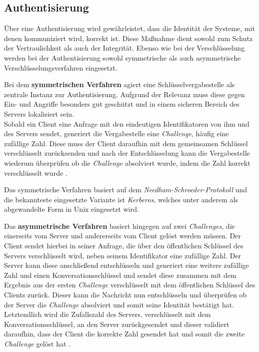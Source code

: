 \documentclass[12pt,a4paper,parskip=half]{scrreprt}
\begin{document}
			\subsection{Authentisierung}
				
				Über eine Authentisierung wird gewährleistet, dass die Identität der Systeme, mit denen kommuniziert wird, korrekt ist. Diese Maßnahme dient sowohl zum Schutz der Vertraulichkeit als auch der Integrität. Ebenso wie bei der Verschlüsselung werden bei der Authentisierung sowohl symmetrische als auch asymmetrische Verschlüsselungsverfahren eingesetzt.
				
				Bei dem \textbf{symmetrischen Verfahren} agiert eine Schlüsselvergabestelle als zentrale Instanz zur Authentisierung. Aufgrund der Relevanz muss diese gegen Ein- und Angriffe besonders gut geschützt und in einem sicheren Bereich des Servers lokalisiert sein. \\
				Sobald ein Client eine Anfrage mit den eindeutigen Identifikatoren von ihm und des Servers sendet, generiert die Vergabestelle eine \textit{Challenge}, häufig eine zufällige Zahl. Diese muss der Client daraufhin mit dem gemeinsamen Schlüssel verschlüsselt zurücksenden und nach der Entschlüsselung kann die Vergabestelle wiederum überprüfen ob die \textit{Challenge} absolviert wurde, indem die Zahl korrekt verschlüsselt wurde \cite{verteilteSysteme}.
				
				Das symmetrische Verfahren basiert auf dem \textit{Needham-Schroeder-Protokoll} und die bekannteste eingesetzte Variante ist \textit{Kerberos}, welches unter anderem als abgewandelte Form in Unix eingesetzt wird.
				
				Das \textbf{asymmetrische Verfahren} basiert hingegen auf zwei \textit{Challenges}, die einerseits vom Server und andererseits vom Client gelöst werden müssen. Der Client sendet hierbei in seiner Anfrage, die über den öffentlichen Schlüssel des Servers verschlüsselt wird, neben seinem Identifikator eine zufällige Zahl. Der Server kann diese anschließend entschlüsseln und generiert eine weitere zufällige Zahl und einen Konversationsschlüssel und sendet diese zusammen mit dem Ergebnis aus der ersten \textit{Challenge} verschlüsselt mit dem öffentlichen Schlüssel des Clients zurück. Dieser kann die Nachricht nun entschlüsseln und überprüfen ob der Server die \textit{Challenge} absolviert und somit seine Identität bestätigt hat. Letztendlich wird die Zufallszahl des Servers, verschlüsselt mit dem Konversationsschlüssel, an den Server zurückgesendet und dieser validiert daraufhin, dass der Client die korrekte Zahl gesendet hat und somit die zweite \textit{Challenge} gelöst hat \cite{verteilteSysteme}.
				
\end{document}
